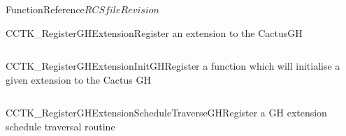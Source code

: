 \begin{cactuspart}{FunctionReference}{$RCSfile$}{$Revision$}
\begin{CCTKFunc}{CCTK\_RegisterGHExtension}{Register an extension to the CactusGH}
\label{CCTK-RegisterGHExtension}
\showcargs
\begin{params}
\end{params}
\begin{discussion}
\end{discussion}
\begin{examples}
\begin{tabular}{@{}p{3cm}cp{11cm}}
\end{tabular}
\end{examples}
\begin{errorcodes}
\end{errorcodes}
\end{CCTKFunc}

\begin{CCTKFunc}{CCTK\_RegisterGHExtensionInitGH}{Register a function which will initialise a given extension to the Cactus GH}
\label{CCTK-RegisterGHExtensionInitGH}
\showcargs
\begin{params}
\end{params}
\begin{discussion}
\end{discussion}
\begin{examples}
\begin{tabular}{@{}p{3cm}cp{11cm}}
\end{tabular}
\end{examples}
\begin{errorcodes}
\end{errorcodes}
\end{CCTKFunc}

\begin{CCTKFunc}{CCTK\_RegisterGHExtensionScheduleTraverseGH}{Register a GH extension schedule traversal routine}
\label{CCTK-RegisterGHExtensionScheduleTraverseGH}
\showcargs
\begin{params}
\end{params}
\begin{discussion}
\end{discussion}
\begin{examples}
\begin{tabular}{@{}p{3cm}cp{11cm}}
\end{tabular}
\end{examples}
\begin{errorcodes}
\end{errorcodes}
\end{CCTKFunc}


\end{cactuspart}
